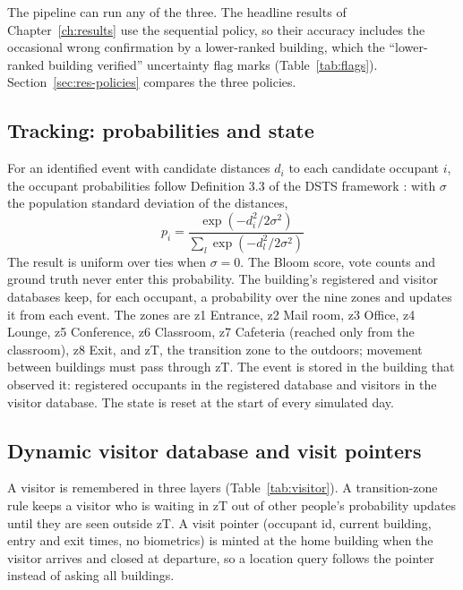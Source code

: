 \documentclass[12pt,a4paper,oneside]{report}
\begin{document}
The pipeline can run any of the three. The headline results of Chapter~\ref{ch:results} use the sequential policy, so their accuracy includes the occasional wrong confirmation by a lower-ranked building, which the ``lower-ranked building verified'' uncertainty flag marks (Table~\ref{tab:flags}). Section~\ref{sec:res-policies} compares the three policies.

\subsection{Tracking: probabilities and state}
For an identified event with candidate distances $d_i$ to each candidate occupant $i$, the occupant probabilities follow Definition 3.3 of the DSTS framework \cite{ref6}: with $\sigma$ the population standard deviation of the distances,
\begin{equation}\label{eq:prob}
p_i=\frac{\exp\!\left(-d_i^{2}/2\sigma^{2}\right)}{\sum_{l}\exp\!\left(-d_l^{2}/2\sigma^{2}\right)}
\end{equation}
The result is uniform over ties when $\sigma=0$. The Bloom score, vote counts and ground truth never enter this probability. The building's registered and visitor databases keep, for each occupant, a probability over the nine zones and updates it from each event. The zones are z1 Entrance, z2 Mail room, z3 Office, z4 Lounge, z5 Conference, z6 Classroom, z7 Cafeteria (reached only from the classroom), z8 Exit, and zT, the transition zone to the outdoors; movement between buildings must pass through zT. The event is stored in the building that observed it: registered occupants in the registered database and visitors in the visitor database. The state is reset at the start of every simulated day.

\subsection{Dynamic visitor database and visit pointers}
A visitor is remembered in three layers (Table~\ref{tab:visitor}). A transition-zone rule keeps a visitor who is waiting in zT out of other people's probability updates until they are seen outside zT. A visit pointer (occupant id, current building, entry and exit times, no biometrics) is minted at the home building when the visitor arrives and closed at departure, so a location query follows the pointer instead of asking all buildings.
\end{document}
